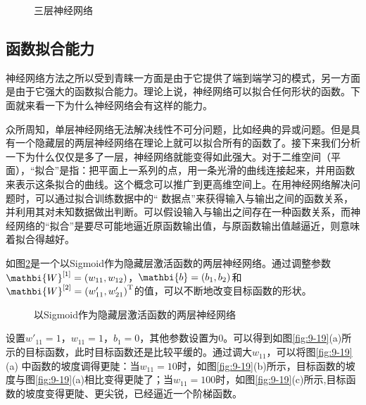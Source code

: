 \begin{figure}[htp]
\centering

\caption{三层神经网络}
\label{fig:9-17}
\end{figure}


\subsection{函数拟合能力}

\parinterval 神经网络方法之所以受到青睐一方面是由于它提供了端到端学习的模式，另一方面是由于它强大的函数拟合能力。理论上说，神经网络可以拟合任何形状的函数。下面就来看一下为什么神经网络会有这样的能力。

\parinterval 众所周知，单层神经网络无法解决线性不可分问题，比如经典的异或问题。但是具有一个隐藏层的两层神经网络在理论上就可以拟合所有的函数了。接下来我们分析一下为什么仅仅是多了一层，神经网络就能变得如此强大。对于二维空间（平面），“拟合”是指：把平面上一系列的点，用一条光滑的曲线连接起来，并用函数来表示这条拟合的曲线。这个概念可以推广到更高维空间上。在用神经网络解决问题时，可以通过拟合训练数据中的“ 数据点”来获得输入与输出之间的函数关系，并利用其对未知数据做出判断。可以假设输入与输出之间存在一种函数关系，而神经网络的“拟合”是要尽可能地逼近原函数输出值，与原函数输出值越逼近，则意味着拟合得越好。


\parinterval 如图\ref{fig:9-18}是一个以Sigmoid作为隐藏层激活函数的两层神经网络。通过调整参数$ {\mathbi{W}}^{[1]}=(w_{11},w_{12}) $，$ {\mathbi{b}}=(b_1,b_2) $和$ {\mathbi{W}}^{[2]}={(w'_{11},w'_{21})}^{\textrm{T}} $的值，可以不断地改变目标函数的形状。


\begin{figure}[htp]
\centering

\caption{以Sigmoid作为隐藏层激活函数的两层神经网络}
\label{fig:9-18}
\end{figure}

\parinterval 设置$ w'_{11}=1 $，$ w_{11}=1 $，$ b_1=0 $，其他参数设置为0。可以得到如图\ref{fig:9-19}(a)所示的目标函数，此时目标函数还是比较平缓的。通过调大$ w_{11} $，可以将图\ref{fig:9-19}(a) 中函数的坡度调得更陡：当$ w_{11}=10 $时，如图\ref{fig:9-19}(b)所示，目标函数的坡度与图\ref{fig:9-19}(a)相比变得更陡了；当$ w_{11}=100 $时，如图\ref{fig:9-19}(c)所示,目标函数的坡度变得更陡、更尖锐，已经逼近一个阶梯函数。

